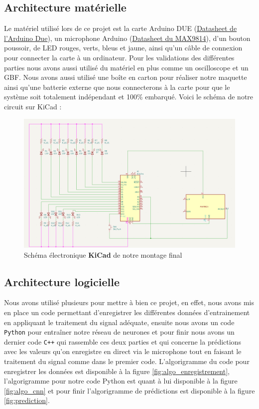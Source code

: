 \documentclass[a4paper,11pt]{article}
\begin{document}
\subsection{Architecture matérielle}
Le matériel utilisé lors de ce projet est la carte Arduino DUE (\href{https://docs.arduino.cc/resources/datasheets/A000062-datasheet.pdf}{Datasheet de l'Arduino Due}), un microphone Arduino (\href{https://www.analog.com/media/en/technical-documentation/data-sheets/max9814.pdf}{Datasheet du MAX9814}), d'un bouton poussoir, de LED rouges, verts, bleus et jaune, ainsi qu'un câble de connexion pour connecter la carte à un ordinateur. Pour les validations des différentes parties nous avons aussi utilisé du matériel en plus comme un oscilloscope et un GBF. Nous avons aussi utilisé une boîte en carton pour réaliser notre maquette ainsi qu'une batterie externe que nous connecterons à la carte pour que le système soit totalement indépendant et 100\% embarqué. Voici le schéma de notre circuit sur KiCad :
\begin{figure}[H]
\centering
\includegraphics[scale=0.35]{images/kicad.png}
\caption{Schéma électronique \textbf{KiCad} de notre montage final}
\end{figure}
			
\subsection{Architecture logicielle}
Nous avons utilisé plusieurs pour mettre à bien ce projet, en effet, nous avons mis en place un code permettant d'enregistrer les différentes données d'entrainement en appliquant le traitement du signal adéquate, ensuite nous avons un code \texttt{Python} pour entraîner notre réseau de neurones et pour finir nous avons un dernier code \texttt{C++} qui rassemble ces deux parties et qui concerne la prédictions avec les valeurs qu'on enregistre en direct via le microphone tout en faisant le traitement du signal comme dans le premier code. L'algorigramme du code pour enregistrer les données est disponible à la figure \ref{fig:algo_enregistrement}, l'algorigramme pour notre code Python est quant à lui disponible à la figure \ref{fig:algo_cnn} et pour finir l'algorigramme de prédictions est disponible à la figure \ref{fig:prediction}.
	
\end{document}
